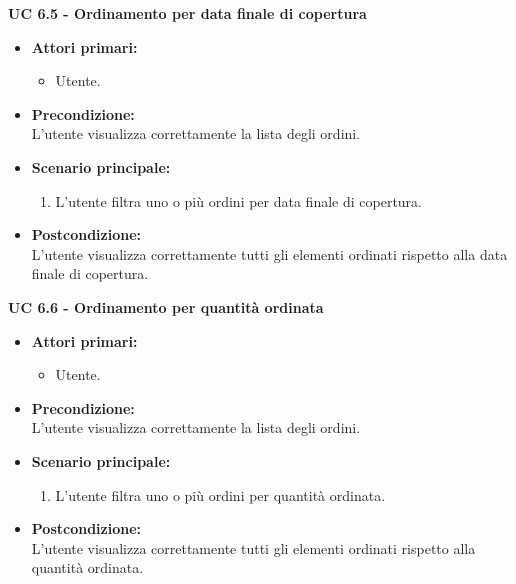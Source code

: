 \vspace{0.5cm}

\noindent \textbf{\large UC 6.5 - Ordinamento per data finale di copertura}
\label{uc:ordinamento-data-finale-copertura}
\begin{itemize}

	\item \textbf{Attori primari: }
		\begin{itemize}
			\item Utente.
		\end{itemize}

	\item \textbf{Precondizione: }\\[0.3cm]
		L'utente visualizza correttamente la lista degli ordini.

	\item \textbf{Scenario principale: }
		\begin{enumerate}
			\item L'utente filtra uno o più ordini per data finale di copertura.
		\end{enumerate}
		

	\item \textbf{Postcondizione: }\\[0.3cm]
		L'utente visualizza correttamente tutti gli elementi ordinati rispetto alla data finale di copertura.

\end{itemize}

\vspace{0.5cm}

\noindent \textbf{\large UC 6.6 - Ordinamento per quantità ordinata}
\label{uc:ordinamento-quantita-ordinata}
\begin{itemize}

	\item \textbf{Attori primari: }
		\begin{itemize}
			\item Utente.
		\end{itemize}

	\item \textbf{Precondizione: }\\[0.3cm]
		L'utente visualizza correttamente la lista degli ordini.

	\item \textbf{Scenario principale: }
		\begin{enumerate}
			\item L'utente filtra uno o più ordini per quantità ordinata.
		\end{enumerate}
		

	\item \textbf{Postcondizione: }\\[0.3cm]
		L'utente visualizza correttamente tutti gli elementi ordinati rispetto alla quantità ordinata.

\end{itemize}

